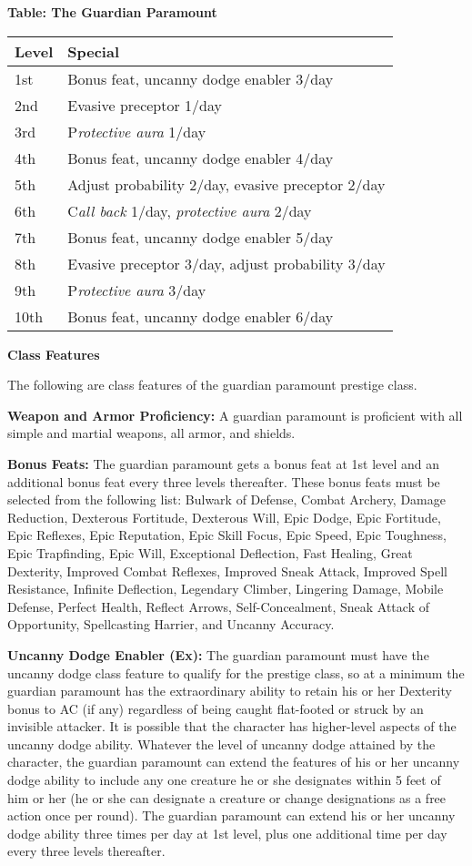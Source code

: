 \documentclass{article}
\begin{document}
\vspace{12pt}
\textbf{Table: The Guardian Paramount }

\begin{tabular}{|>{\raggedright}p{27pt}|>{\raggedright}p{204pt}|}
\hline
L\textbf{evel} & S\textbf{pecial }\tabularnewline
\hline
1st & Bonus feat, uncanny dodge enabler 3/day \tabularnewline
\hline
2nd & Evasive preceptor 1/day \tabularnewline
\hline
3rd & P\textit{rotective aura }1/day \tabularnewline
\hline
4th & Bonus feat, uncanny dodge enabler 4/day \tabularnewline
\hline
5th & Adjust probability 2/day, evasive preceptor 2/day \tabularnewline
\hline
6th & C\textit{all back }1/day, \textit{protective aura }2/day \tabularnewline
\hline
7th & Bonus feat, uncanny dodge enabler 5/day \tabularnewline
\hline
8th & Evasive preceptor 3/day, adjust probability 3/day \tabularnewline
\hline
9th & P\textit{rotective aura }3/day \tabularnewline
\hline
10th & Bonus feat, uncanny dodge enabler 6/day \tabularnewline
\hline
\end{tabular}

\vspace{12pt}
\textbf{Class Features}

The following are class features of the guardian paramount prestige class. 

\textbf{Weapon and Armor Proficiency:} A guardian paramount is proficient with 
all simple and martial weapons, all armor, and shields. 

\textbf{Bonus Feats:} The guardian paramount gets a bonus feat at 1st level and 
an additional bonus feat every three levels thereafter. These bonus feats must 
be selected from the following list: Bulwark of Defense, Combat Archery, Damage 
Reduction, Dexterous Fortitude, Dexterous Will, Epic Dodge, Epic Fortitude, Epic 
Reflexes, Epic Reputation, Epic Skill Focus, Epic Speed, Epic Toughness, Epic Trapfinding, 
Epic Will, Exceptional Deflection, Fast Healing, Great Dexterity, Improved Combat 
Reflexes, Improved Sneak Attack, Improved Spell Resistance, Infinite Deflection, 
Legendary Climber, Lingering Damage, Mobile Defense, Perfect Health, Reflect Arrows, 
Self-Concealment, Sneak Attack of Opportunity, Spellcasting Harrier, and Uncanny 
Accuracy. 

\textbf{Uncanny Dodge Enabler (Ex):} The guardian paramount must have the uncanny 
dodge class feature to qualify for the prestige class, so at a minimum the guardian 
paramount has the extraordinary ability to retain his or her Dexterity bonus to 
AC (if any) regardless of being caught flat-footed or struck by an invisible attacker. 
It is possible that the character has higher-level aspects of the uncanny dodge 
ability. Whatever the level of uncanny dodge attained by the character, the guardian 
paramount can extend the features of his or her uncanny dodge ability to include 
any one creature he or she designates within 5 feet of him or her (he or she can 
designate a creature or change designations as a free action once per round). The 
guardian paramount can extend his or her uncanny dodge ability three times per 
day at 1st level, plus one additional time per day every three levels thereafter. 
\end{document}
